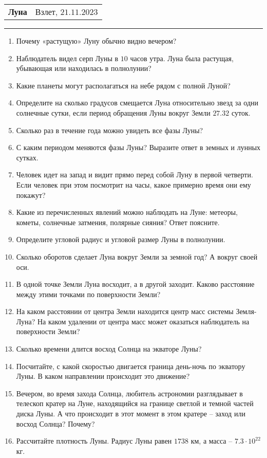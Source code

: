 \documentclass[12pt]{article}
\begin{document}
\begin{tabularx}{\textwidth}{Xr}
{\Large \textbf{Луна}} & Взлет, $21.11.2023$ \\
\end{tabularx}
\noindent\rule{\textwidth}{0.4pt}
\begin{enumerate}
		\item Почему «растущую» Луну обычно видно вечером? 
		\item Наблюдатель видел серп Луны в $10$ часов утра. Луна была растущая, убывающая или находилась в полнолунии?
		\item Какие планеты могут располагаться на небе рядом с полной Луной? 
		\item Определите на сколько градусов смещается Луна относительно звезд за одни солнечные сутки, если период обращения Луны вокруг Земли $27.32$ суток.
		\item Сколько раз в течение года можно увидеть все фазы Луны?
		\item С каким периодом меняются фазы Луны? Выразите ответ в земных и лунных сутках.
		\item Человек идет на запад и видит прямо перед собой Луну в первой четверти. Если человек при этом посмотрит на часы, какое примерно время они ему покажут?
		\item Какие из перечисленных явлений можно наблюдать на Луне: метеоры, кометы, солнечные затмения, полярные сияния? Ответ поясните.	
		\item Определите угловой радиус и угловой размер Луны в полнолунии.
		\item Сколько оборотов сделает Луна вокруг Земли за земной год? А вокруг своей оси.
		\item В одной точке Земли Луна восходит, а в другой заходит. Каково расстояние между этими точками по поверхности Земли?
		\item На каком расстоянии от центра Земли находится центр масс системы Земля-Луна? На каком удалении от центра масс может оказаться наблюдатель на поверхности Земли?
		\item Сколько времени длится восход Солнца на экваторе Луны?
		\item Посчитайте, с какой скоростью двигается граница день-ночь по экватору Луны. В каком направлении происходит это движение?
		\item Вечером, во время захода Солнца, любитель астрономии разглядывает в телескоп кратер на Луне, находящийся на границе светлой и темной частей диска Луны. А что происходит в этот момент в этом кратере -- заход или восход Солнца? Почему?
		\item Рассчитайте плотность Луны. Радиус Луны равен $1738$ км, а масса -- $7.3\cdot10^{22}$ кг.
\end{enumerate}
\end{document}
